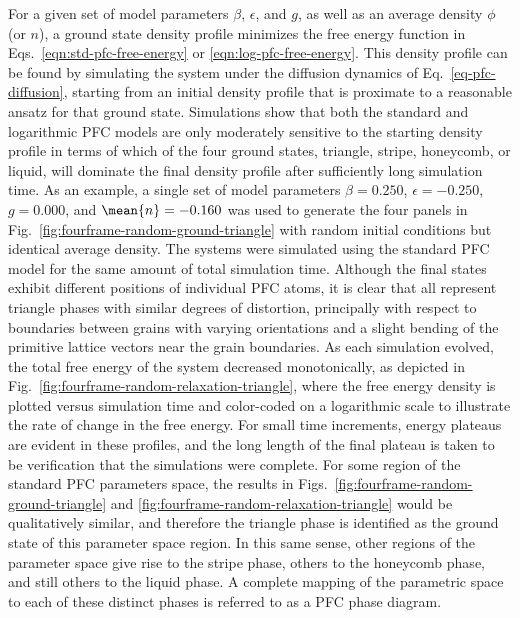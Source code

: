 For a given set of model parameters $\beta$, $\epsilon$, and $g$, as well as an average density $\phi$ (or $n$), a ground state density profile minimizes the free energy function in Eqs.~\ref{eqn:std-pfc-free-energy} or \ref{eqn:log-pfc-free-energy}.  This density profile can be found by simulating the system under the diffusion dynamics of Eq.~\ref{eq-pfc-diffusion}, starting from an initial density profile that is proximate to a reasonable ansatz for that ground state.  Simulations show that both the standard and logarithmic PFC models are only moderately sensitive to the starting density profile in terms of which of the four ground states, triangle, stripe, honeycomb, or liquid, will dominate the final density profile after sufficiently long simulation time.  As an example, a single set of model parameters $\beta=0.250$, $\epsilon=-0.250$, $g=0.000$, and $\mean{n}=-0.160$ was used to generate the four panels in Fig.~\ref{fig:fourframe-random-ground-triangle} with random initial conditions but identical average density.  The systems were simulated using the standard PFC model for the same amount of total simulation time. Although the final states exhibit different positions of individual PFC atoms, it is clear that all represent triangle phases with similar degrees of distortion, principally with respect to boundaries between grains with varying orientations and a slight bending of the primitive lattice vectors near the grain boundaries.  As each simulation evolved, the total free energy of the system decreased monotonically, as depicted in Fig.~\ref{fig:fourframe-random-relaxation-triangle}, where the free energy density is plotted versus simulation time and color-coded on a logarithmic scale to illustrate the rate of change in the free energy.  For small time increments, energy plateaus are evident in these profiles, and the long length of the final plateau is taken to be verification that the simulations were complete.  For some region of the standard PFC parameters space, the results in Figs.~\ref{fig:fourframe-random-ground-triangle} and \ref{fig:fourframe-random-relaxation-triangle} would be qualitatively similar, and therefore the triangle phase is identified as the ground state of this parameter space region.  In this same sense, other regions of the parameter space give rise to the stripe phase, others to the honeycomb phase, and still others to the liquid phase.  A complete mapping of the parametric space to each of these distinct phases is referred to as a PFC phase diagram.
%
\newcommand{\cornerlabel}[1]{%
  \put(98,96){%
    \begin{tikzpicture}[overlay]
      \node[
        anchor=north east,   %
        fill=white,
        fill opacity=0.6,
        text opacity=1,
        inner sep=3pt,
        rounded corners=2pt
      ] {\textbf{#1}};
    \end{tikzpicture}
  }%
}
